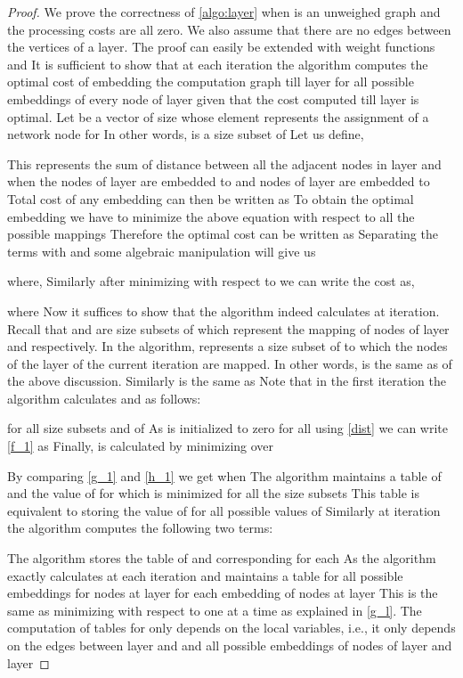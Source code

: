 \documentclass[journal]{IEEEtran}
\begin{document}
\begin{proof}
  We prove the correctness of \ref{algo:layer} when  is an
  unweighed graph and the processing costs are all zero.  We also
  assume that there are no edges between the vertices of a layer. The
  proof can easily be extended with weight functions  and  It
  is sufficient to show that at each iteration  the algorithm
  computes the optimal cost of embedding the computation graph till
  layer  for all possible embeddings of every node of layer 
  given that the cost computed till layer  is optimal. Let
   be a vector of size  whose 
  element represents the assignment of a network node for  In other words,  is a  size subset
  of  Let us define,

This represents the sum of distance between all the adjacent nodes
  in layer  and  when the nodes of layer  are embedded to
   and nodes of layer  are embedded to
   Total cost of any embedding can then be written
  as 
  To obtain the optimal embedding we have to minimize the above
  equation with respect to all the possible mappings 
  Therefore the optimal cost can be written as 
  Separating the terms with  and some algebraic
  manipulation will give us
     
where,  Similarly after minimizing with respect 
  to  we can write the cost as,

where  Now it suffices to show that the algorithm
  indeed calculates  at  iteration. Recall that
   and  are  size subsets of
   which represent the mapping of nodes of layer  and
   respectively. In the algorithm,  represents a  size
  subset of  to which the nodes of the layer of the current
  iteration are mapped. In other words,  is the same as
   of the above discussion. Similarly  is the same
  as  Note that in the first iteration the algorithm
  calculates  and  as follows:

for all  size subsets  and  of  As
   is initialized to zero for all  using \eqref{dist}
  we can write \eqref{f_1} as  
  Finally,  is calculated by minimizing  over 
   
By comparing \eqref{g_1} and \eqref{h_1} we get  when  The algorithm maintains
  a table of  and the value of  for which  is
  minimized for all the  size subsets  This table is
  equivalent to storing the value of  for all
  possible values of  Similarly at  iteration
  the algorithm computes the following two terms:
  
The algorithm stores the table of  and corresponding  for
  each  As 
  the algorithm exactly calculates  at each iteration and
  maintains a table for all possible embeddings for nodes at layer 
  for each embedding of nodes at layer  This is the same as
  minimizing with respect to one  at a time as explained in
  \eqref{g_l}. The computation of tables for  only depends on the
  local variables, i.e., it only depends on the edges between layer
   and  and all possible embeddings of nodes of layer  and
  layer 


\end{proof}
\end{document}
